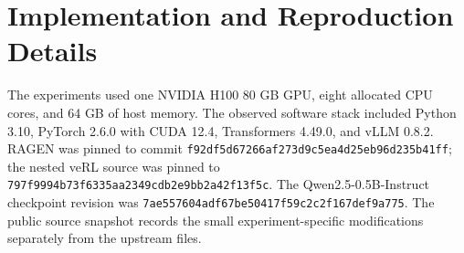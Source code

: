\documentclass[10pt,twocolumn,letterpaper]{article}
\begin{document}
\newpage


\onecolumn
\appendix
\section{Implementation and Reproduction Details}\label{app:reproduction}
The experiments used one NVIDIA H100 80 GB GPU, eight allocated CPU cores, and 64 GB of host memory. The observed software stack included Python 3.10, PyTorch 2.6.0 with CUDA 12.4, Transformers 4.49.0, and vLLM 0.8.2. RAGEN was pinned to commit {\scriptsize\texttt{f92df5d67266af273d9c5ea4d25eb96d235b41ff}}; the nested veRL source was pinned to {\scriptsize\texttt{797f9994b73f6335aa2349cdb2e9bb2a42f13f5c}}. The Qwen2.5-0.5B-Instruct checkpoint revision was {\scriptsize\texttt{7ae557604adf67be50417f59c2c2f167def9a775}}. The public source snapshot records the small experiment-specific modifications separately from the upstream files.
\end{document}
